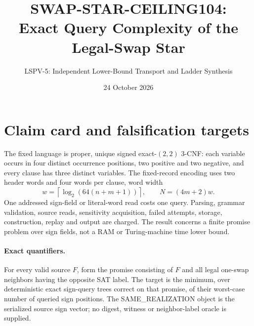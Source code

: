 \documentclass[11pt]{article}
\title{SWAP-STAR-CEILING104:\\Exact Query Complexity of the Legal-Swap Star}
\author{LSPV-5: Independent Lower-Bound Transport and Ladder Synthesis}
\date{24 October 2026}
\begin{document}
\maketitle
\begin{center}
\end{center}

\section{Claim card and falsification targets}
The fixed language is proper, unique signed exact-$(2,2)$ 3-CNF: each
variable occurs in four distinct occurrence positions, two positive and two
negative, and every clause has three distinct variables. The fixed-record
encoding uses two header words and four words per clause, word width
\[
 w=\left\lceil\log_2(64(n+m+1))\right\rceil,\qquad N=(4m+2)w.
\]
One addressed sign-field or literal-word read costs one query. Parsing,
grammar validation, source reads, sensitivity acquisition, failed attempts,
storage, construction, replay and output are charged. The result concerns a
finite promise problem over sign fields, not a RAM or Turing-machine time
lower bound.

\paragraph{Exact quantifiers.}
For every valid source $F$, form the promise consisting of $F$ and all legal
one-swap neighbors having the opposite SAT label. The target is the minimum,
over deterministic exact sign-query trees correct on that promise, of their
worst-case number of queried sign positions. The SAME\_REALIZATION object is
the serialized source sign vector; no digest, witness or neighbor-label oracle
is supplied.
\end{document}
